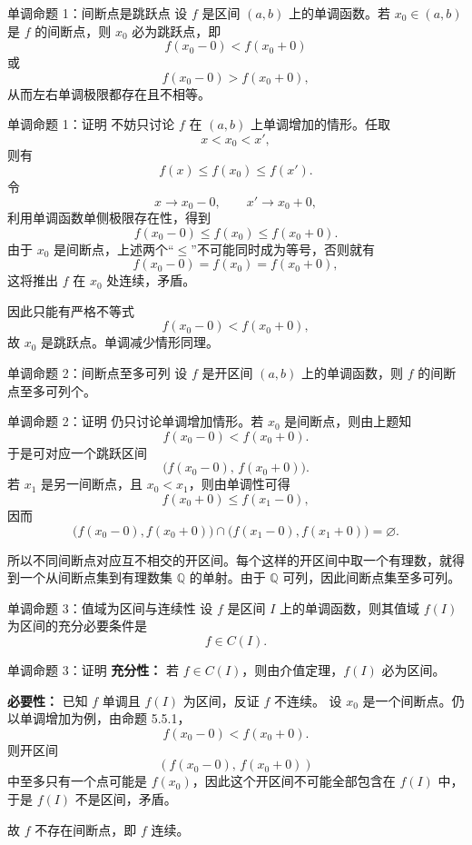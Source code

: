 ﻿\documentclass[aspectratio=169,11pt]{ctexbeamer}
\begin{document}
\begin{frame}{单调命题 1：间断点是跳跃点}
设 $f$ 是区间 $(a,b)$ 上的单调函数。若 $x_0\in(a,b)$ 是 $f$ 的间断点，则 $x_0$ 必为跳跃点，即
\[
  f(x_0-0)<f(x_0+0)
\]
或
\[
  f(x_0-0)>f(x_0+0),
\]
从而左右单调极限都存在且不相等。
\end{frame}

\begin{frame}[allowframebreaks]{单调命题 1：证明}
不妨只讨论 $f$ 在 $(a,b)$ 上单调增加的情形。任取
\[
  x<x_0<x',
\]
则有
\[
  f(x)\le f(x_0)\le f(x').
\]
令
\[
  x\to x_0-0,\qquad x'\to x_0+0,
\]
利用单调函数单侧极限存在性，得到
\[
  f(x_0-0)\le f(x_0)\le f(x_0+0).
\]
由于 $x_0$ 是间断点，上述两个“$\le$”不可能同时成为等号，否则就有
\[
  f(x_0-0)=f(x_0)=f(x_0+0),
\]
这将推出 $f$ 在 $x_0$ 处连续，矛盾。
\vspace{0.5em}

因此只能有严格不等式
\[
  f(x_0-0)<f(x_0+0),
\]
故 $x_0$ 是跳跃点。单调减少情形同理。
\end{frame}

\begin{frame}{单调命题 2：间断点至多可列}
设 $f$ 是开区间 $(a,b)$ 上的单调函数，则 $f$ 的间断点至多可列个。
\end{frame}

\begin{frame}{单调命题 2：证明}
仍只讨论单调增加情形。若 $x_0$ 是间断点，则由上题知
\[
  f(x_0-0)<f(x_0+0).
\]
于是可对应一个跳跃区间
\[
  \bigl(f(x_0-0),\,f(x_0+0)\bigr).
\]
若 $x_1$ 是另一间断点，且 $x_0<x_1$，则由单调性可得
\[
  f(x_0+0)\le f(x_1-0),
\]
因而
\[
  \bigl(f(x_0-0),f(x_0+0)\bigr)\cap
  \bigl(f(x_1-0),f(x_1+0)\bigr)=\varnothing.
\]
\vspace{0.5em}

所以不同间断点对应互不相交的开区间。每个这样的开区间中取一个有理数，就得到一个从间断点集到有理数集 $\mathbb Q$ 的单射。由于 $\mathbb Q$ 可列，因此间断点集至多可列。
\end{frame}

\begin{frame}{单调命题 3：值域为区间与连续性}
设 $f$ 是区间 $I$ 上的单调函数，则其值域 $f(I)$ 为区间的充分必要条件是
\[
  f\in C(I).
\]
\end{frame}

\begin{frame}{单调命题 3：证明}
\textbf{充分性：} 若 $f\in C(I)$，则由介值定理，$f(I)$ 必为区间。
\vspace{0.6em}

\textbf{必要性：} 已知 $f$ 单调且 $f(I)$ 为区间，反证 $f$ 不连续。  
设 $x_0$ 是一个间断点。仍以单调增加为例，由命题 5.5.1，
\[
  f(x_0-0)<f(x_0+0).
\]
则开区间
\[
  (f(x_0-0),\,f(x_0+0))
\]
中至多只有一个点可能是 $f(x_0)$，因此这个开区间不可能全部包含在 $f(I)$ 中，于是 $f(I)$ 不是区间，矛盾。
\vspace{0.5em}

故 $f$ 不存在间断点，即 $f$ 连续。
\end{frame}
\end{document}
